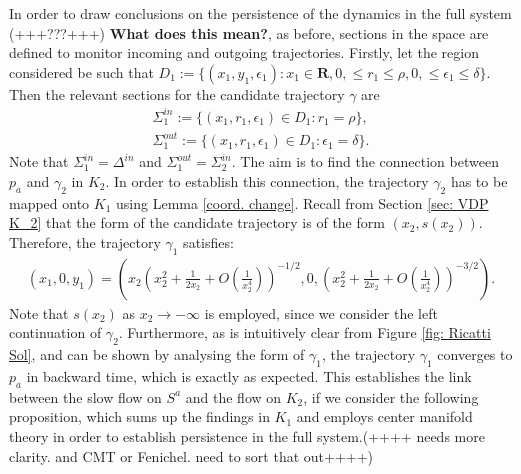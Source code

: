 In order to draw conclusions on the persistence of the dynamics in the full system (+++???+++) \textbf{What does this mean?}, as before, sections in the space are defined to monitor incoming and outgoing trajectories.
Firstly, let the region considered be such that
$D_1:= \{ (x_1,y_1,\epsilon_1): x_1 \in \mathbf{R}, 0, \leq r_1 \leq \rho, 0, \leq\epsilon_1 \leq \delta\}$.
Then the relevant sections for the candidate trajectory $\gamma$ are
\begin{align*}
\Sigma^{in}_1 := \{ (x_1,r_1, \epsilon_1) \in D_1 : r_1 = \rho \}, \\
\Sigma^{out}_1 := \{ (x_1,r_1, \epsilon_1) \in D_1 : \epsilon_1=\delta \}.
\end{align*}
Note that $\Sigma^{in}_1 = \Delta^{in}$ and $\Sigma^{out}_1=\Sigma^{in}_2$.
The aim is to find the connection between $p_a$ and $\gamma_2$ in $K_2$. In order to establish this connection, the trajectory $\gamma_2$ has to be mapped onto $K_1$ using Lemma \ref{coord. change}. Recall from Section \ref{sec: VDP K_2} that the form of the candidate trajectory is of the form $(x_2, s(x_2))$.
Therefore, the trajectory $\gamma_1$ satisfies:
\begin{align*}
(x_1, 0, y_1) = \left(x_2 \left(x_2^2 + \frac{1}{2x_2} + O\left(\frac{1}{x_2^4} \right) \right)^{-1/2}, 0, \left(x_2^2 + \frac{1}{2x_2} + O\left(\frac{1}{x_2^4} \right)\right)^{-3/2} \right).
\end{align*}
Note that $s(x_2)$ as $x_2 \to - \infty$ is employed, since we consider the left continuation of $\gamma_2$.
Furthermore, as is intuitively clear from Figure \ref{fig: Ricatti Sol}, and can be shown by analysing the form of $\gamma_1$, the trajectory $\gamma_1$ converges to $p_a$ in backward time, which is exactly as expected.
This establishes the link between the slow flow on $S^a$ and the flow on $K_2$, if we consider the following proposition, which sums up the findings in $K_1$ and employs center manifold theory in order to establish persistence in the full system.(++++ needs more clarity. and CMT or Fenichel. need to sort that out++++)
